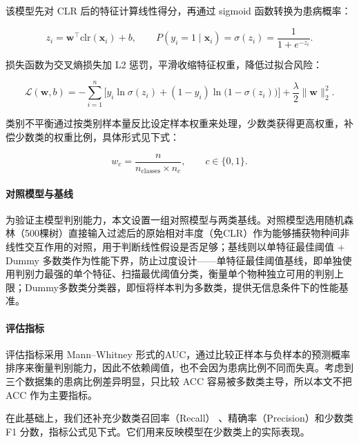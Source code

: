 \documentclass{../../latex/templates/mcm-paper}
\begin{document}
该模型先对 CLR 后的特征计算线性得分，再通过 sigmoid 函数转换为患病概率：

\begin{equation}
z_i = \mathbf{w}^{\top}\mathrm{clr}(\mathbf{x}_i) + b,
  \qquad
  P(y_i=1\mid \mathbf{x}_i) = \sigma(z_i) = \frac{1}{1+e^{-z_i}}.
\label{eq:s1-logistic}
\end{equation}

损失函数为交叉熵损失加 L2 惩罚，平滑收缩特征权重，降低过拟合风险：

\begin{equation}
\mathcal{L}(\mathbf{w},b) =
  -\sum_{i=1}^{n}\Big[y_i\ln\sigma(z_i) + (1-y_i)\ln\big(1-\sigma(z_i)\big)\Big]
  + \frac{\lambda}{2}\lVert\mathbf{w}\rVert_2^2.
\label{eq:s1-loss}
\end{equation}

类别不平衡通过按类别样本量反比设定样本权重来处理，少数类获得更高权重，补偿少数类的权重比例，具体形式见下式：

\begin{equation}
w_c = \frac{n}{n_{\text{classes}} \times n_c},
  \qquad
  c \in \{0,1\}.
\label{eq:s1-classweight}
\end{equation}

\paragraph{对照模型与基线}

为验证主模型判别能力，本文设置一组对照模型与两类基线。对照模型选用随机森林（500棵树）直接输入过滤后的原始相对丰度（免CLR）作为能够捕获物种间非线性交互作用的对照，用于判断线性假设是否足够；基线则以单特征最佳阈值 + Dummy 多数类作为性能下界，防止过度设计——单特征最佳阈值基线，即单独使用判别力最强的单个特征、扫描最优阈值分类，衡量单个物种独立可用的判别上限；Dummy多数类分类器，即恒将样本判为多数类，提供无信息条件下的性能基准。

\paragraph{评估指标}

评估指标采用 Mann–Whitney 形式的AUC，通过比较正样本与负样本的预测概率排序来衡量判别能力，因此不依赖阈值，也不会因为患病比例不同而失真。考虑到三个数据集的患病比例差异明显，只比较 ACC 容易被多数类主导，所以本文不把 ACC 作为主要指标。

在此基础上，我们还补充少数类召回率（Recall） 、精确率（Precision）和少数类 F1 分数，指标公式见下式。它们用来反映模型在少数类上的实际表现。
\end{document}

